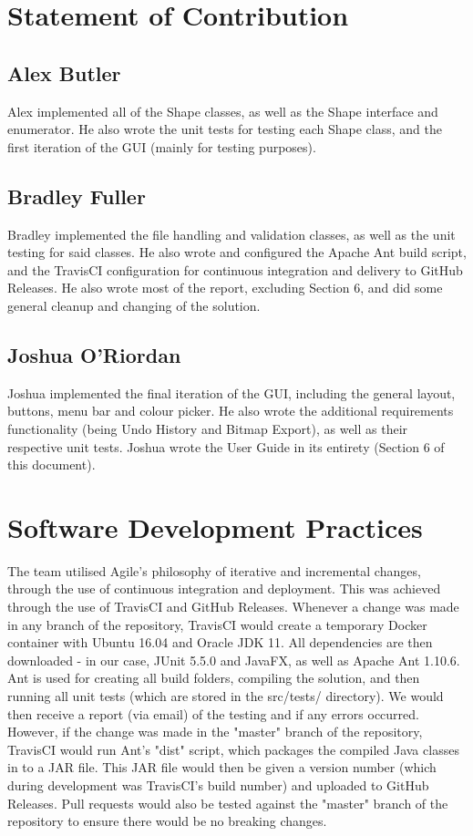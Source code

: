 \documentclass[12pt]{article} %
\begin{document}
\newpage

\section{Statement of Contribution}

\subsection{Alex Butler}
Alex implemented all of the Shape classes, as well as the Shape interface and enumerator. He also wrote the unit tests for testing each Shape class, and the first iteration of the GUI (mainly for testing purposes). 
\subsection{Bradley Fuller}
Bradley implemented the file handling and validation classes, as well as the unit testing for said classes. He also wrote and configured the Apache Ant build script, and the TravisCI configuration for continuous integration and delivery to GitHub Releases. He also wrote most of the report, excluding Section 6, and did some general cleanup and changing of the solution.
\subsection{Joshua O'Riordan}
Joshua implemented the final iteration of the GUI, including the general layout, buttons, menu bar and colour picker. He also wrote the additional requirements functionality (being Undo History and Bitmap Export), as well as their respective unit tests. Joshua wrote the User Guide in its entirety (Section 6 of this document).

\newpage

\section{Software Development Practices}

The team utilised Agile's philosophy of iterative and incremental changes, through the use of continuous integration and deployment. This was achieved through the use of TravisCI and GitHub Releases. Whenever a change was made in any branch of the repository, TravisCI would create a temporary Docker container with Ubuntu 16.04 and Oracle JDK 11. All dependencies are then downloaded - in our case, JUnit 5.5.0 and JavaFX, as well as Apache Ant 1.10.6. Ant is used for creating all build folders, compiling the solution, and then running all unit tests (which are stored in the src/tests/ directory). We would then receive a report (via email) of the testing and if any errors occurred. However, if the change was made in the "master" branch of the repository, TravisCI would run Ant's "dist" script, which packages the compiled Java classes in to a JAR file. This JAR file would then be given a version number (which during development was TravisCI's build number) and uploaded to GitHub Releases. Pull requests would also be tested against the "master" branch of the repository to ensure there would be no breaking changes.
\end{document}
